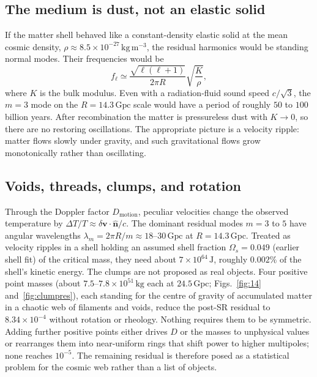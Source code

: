 \documentclass[11pt,a4paper]{article}
\begin{document}
\subsection{The medium is dust, not an elastic solid}

If the matter shell behaved like a constant-density elastic solid at the mean cosmic density, \(\rho\approx8.5\times10^{-27}\,\mathrm{kg\,m^{-3}}\), the residual harmonics would be standing normal modes. Their frequencies would be
\begin{equation}
\label{eq:fell}
f_{\ell}\simeq\frac{\sqrt{\ell(\ell+1)}}{2\pi R}\sqrt{\frac{K}{\rho}},
\end{equation}
where \(K\) is the bulk modulus. Even with a radiation-fluid sound speed \(c/\sqrt{3}\), the \(m=3\) mode on the \(R=14.3\,\mathrm{Gpc}\) scale would have a period of roughly \(50\) to \(100\) billion years. After recombination the matter is pressureless dust with \(K\to0\), so there are no restoring oscillations. The appropriate picture is a velocity ripple: matter flows slowly under gravity, and such gravitational flows grow monotonically rather than oscillating.

\subsection{Voids, threads, clumps, and rotation}

Through the Doppler factor \(D_{\mathrm{motion}}\), peculiar velocities change the observed temperature by \(\Delta T/T\approx\delta\mathbf{v}\cdot\hat{\mathbf{n}}/c\). The dominant residual modes \(m=3\) to \(5\) have angular wavelengths \(\lambda_{m}=2\pi R/m\approx18\)--\(30\,\mathrm{Gpc}\) at \(R=14.3\,\mathrm{Gpc}\). Treated as velocity ripples in a shell holding an assumed shell fraction \(\Omega_{s}=0.049\) (earlier shell fit) of the critical mass, they need about \(7\times10^{64}\,\mathrm{J}\), roughly \(0.002\%\) of the shell's kinetic energy. The clumps are not proposed as real objects. Four positive point masses (about \(7.5\)--\(7.8\times10^{51}\,\mathrm{kg}\) each at \(24.5\,\mathrm{Gpc}\); Figs.~\ref{fig:14} and~\ref{fig:clumpres}), each standing for the centre of gravity of accumulated matter in a chaotic web of filaments and voids, reduce the post-SR residual to \(8.34\times10^{-4}\) without rotation or rheology. Nothing requires them to be symmetric. Adding further positive points either drives \(D\) or the masses to unphysical values or rearranges them into near-uniform rings that shift power to higher multipoles; none reaches \(10^{-5}\). The remaining residual is therefore posed as a statistical problem for the cosmic web rather than a list of objects.
\end{document}
